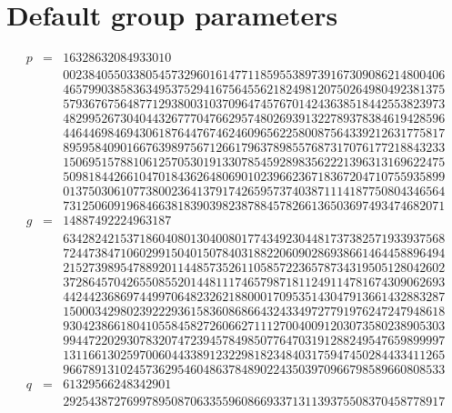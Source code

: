 \documentclass[a4paper]{article}
\begin{document}
\section{Default group parameters}
\label{default-group}

\[
\begin{array}{lcr}
p&=&16328632084933010\\
&&002384055033805457329601614771185955389739167309086214800406\\
&&465799038583634953752941675645562182498120750264980492381375\\
&&579367675648771293800310370964745767014243638518442553823973\\
&&482995267304044326777047662957480269391322789378384619428596\\
&&446446984694306187644767462460965622580087564339212631775817\\
&&895958409016676398975671266179637898557687317076177218843233\\
&&150695157881061257053019133078545928983562221396313169622475\\
&&509818442661047018436264806901023966236718367204710755935899\\
&&013750306107738002364137917426595737403871114187750804346564\\
&&731250609196846638183903982387884578266136503697493474682071\\
g&=&14887492224963187\\
&&634282421537186040801304008017743492304481737382571933937568\\
&&724473847106029915040150784031882206090286938661464458896494\\
&&215273989547889201144857352611058572236578734319505128042602\\
&&372864570426550855201448111746579871811249114781674309062693\\
&&442442368697449970648232621880001709535143047913661432883287\\
&&150003429802392229361583608686643243349727791976247247948618\\
&&930423866180410558458272606627111270040091203073580238905303\\
&&994472202930783207472394578498507764703191288249547659899997\\
&&131166130259700604433891232298182348403175947450284433411265\\
&&966789131024573629546048637848902243503970966798589660808533\\
q&=&61329566248342901\\
&&292543872769978950870633559608669337131139375508370458778917
\end{array}
\]
\end{document}
